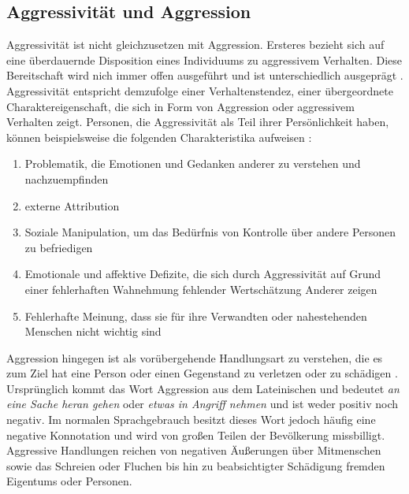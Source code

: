 \subsection{Aggressivität und Aggression}    \label{subsec_2.1.1}

Aggressivität ist nicht gleichzusetzen mit Aggression. Ersteres bezieht sich auf eine überdauernde Disposition eines Individuums zu aggressivem Verhalten. Diese Bereitschaft wird nich immer offen ausgeführt und ist unterschiedlich ausgeprägt
\parencite{Def_unterscheidung_Springer, Def_Aggressivität_Duden, Def_Aggressivität_Spektrum}. Aggressivität entspricht demzufolge einer Verhaltenstendez, einer übergeordnete Charaktereigenschaft, die sich in Form von Aggression oder aggressivem Verhalten zeigt. Personen, die Aggressivität als Teil ihrer Persönlichkeit haben, können beispielsweise die folgenden Charakteristika aufweisen \parencite{Def_Aggressivität_eng1}:
\begin{enumerate} [leftmargin=1.25cm] 
      \item Problematik, die Emotionen und Gedanken anderer zu verstehen und nachzuempfinden
      \item externe Attribution
      \item Soziale Manipulation, um das Bedürfnis von Kontrolle über andere 
            Personen zu befriedigen
      \item Emotionale und affektive Defizite, die sich durch Aggressivität auf Grund einer fehlerhaften Wahnehmung fehlender Wertschätzung Anderer zeigen
      \item Fehlerhafte Meinung, dass sie für ihre Verwandten oder nahestehenden Menschen nicht wichtig sind
\end{enumerate}

Aggression hingegen ist als vorübergehende Handlungsart zu verstehen, die es zum Ziel hat eine Person oder einen Gegenstand zu verletzen oder zu schädigen
\parencite{Def_Aggression_1939, Def_unterscheidung_Springer, Def_Aggression_Duden}.
Ursprünglich kommt das Wort Aggression aus dem Lateinischen und bedeutet 
\textit{an eine Sache heran gehen} oder \textit{etwas in Angriff nehmen} \parencite{was_Aggression} und ist weder positiv noch negativ. Im normalen Sprachgebrauch besitzt dieses Wort jedoch häufig eine negative Konnotation und wird von großen Teilen der Bevölkerung missbilligt. Aggressive Handlungen reichen von negativen Äußerungen über Mitmenschen sowie das Schreien oder Fluchen bis hin zu beabsichtigter Schädigung fremden Eigentums oder Personen. 

